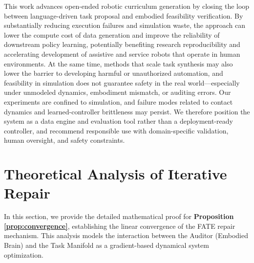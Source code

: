 \documentclass{article}
\theoremstyle{plain}
\theoremstyle{definition}
\theoremstyle{remark}
\begin{document}
This work advances open-ended robotic curriculum generation by closing the loop between language-driven task proposal and embodied feasibility verification. By substantially reducing execution failures and simulation waste, the approach can lower the compute cost of data generation and improve the reliability of downstream policy learning, potentially benefiting research reproducibility and accelerating development of assistive and service robots that operate in human environments. At the same time, methods that scale task synthesis may also lower the barrier to developing harmful or unauthorized automation, and feasibility in simulation does not guarantee safety in the real world—especially under unmodeled dynamics, embodiment mismatch, or auditing errors. Our experiments are confined to simulation, and failure modes related to contact dynamics and learned-controller brittleness may persist. We therefore position the system as a data engine and evaluation tool rather than a deployment-ready controller, and recommend responsible use with domain-specific validation, human oversight, and safety constraints.





\newpage
\appendix
\onecolumn

\section{Theoretical Analysis of Iterative Repair}
\label{sec:appendix_proof}

In this section, we provide the detailed mathematical proof for \textbf{Proposition \ref{prop:convergence}}, establishing the linear convergence of the FATE repair mechanism. This analysis models the interaction between the Auditor (Embodied Brain) and the Task Manifold as a gradient-based dynamical system optimization.
\end{document}
